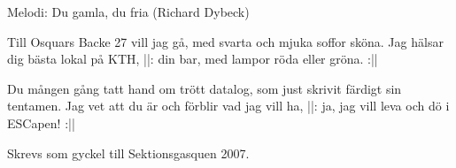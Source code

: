 \begin{song}

\begin{songmeta}
Melodi: Du gamla, du fria (Richard Dybeck)
\end{songmeta}

\begin{songtext}
Till Osquars Backe 27 vill jag gå,
med svarta och mjuka soffor sköna.
Jag hälsar dig bästa lokal på KTH,
||: din bar, med lampor röda eller gröna. :||

Du mången gång tatt hand om trött datalog,
som just skrivit färdigt sin tentamen.
Jag vet att du är och förblir vad jag vill ha,
||: ja, jag vill leva och dö i ESCapen! :||
\end{songtext}

\begin{songnotes}
Skrevs som gyckel till Sektionsgasquen 2007.
\end{songnotes}
\end{song}

